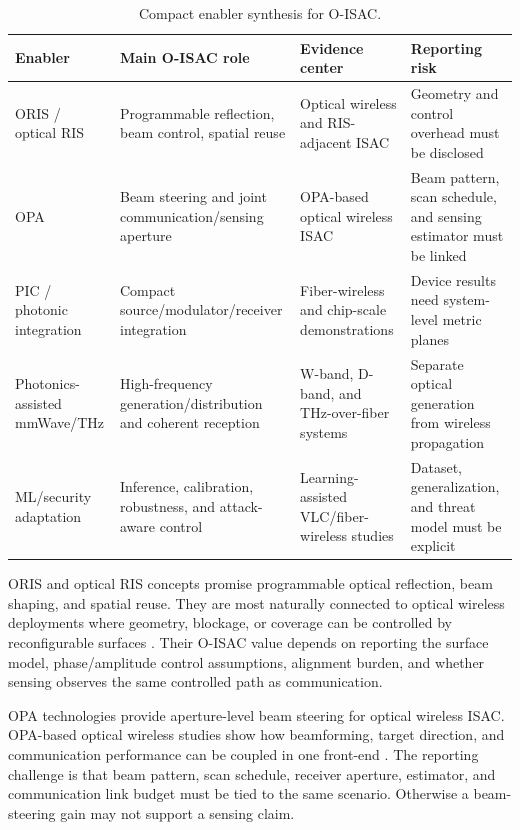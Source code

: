 \documentclass[letterpaper,journal]{IEEEtran}
\begin{document}
\begin{table}[!t]
    \caption{Compact enabler synthesis for O-ISAC.}
    \label{tab:vi_a_enablers}
    \centering
    \scriptsize
    \setlength{\tabcolsep}{2.8pt}
    \renewcommand{\arraystretch}{1.08}
    \begin{tabularx}{\textwidth}{@{}L{2.15cm}L{2.65cm}L{2.3cm}X@{}}
        \toprule
        Enabler & Main O-ISAC role & Evidence center & Reporting risk \\
        \midrule
        ORIS / optical RIS & Programmable reflection, beam control, spatial reuse & Optical wireless and RIS-adjacent ISAC \cite{O_ISAC_163} & Geometry and control overhead must be disclosed \\
        OPA & Beam steering and joint communication/sensing aperture & OPA-based optical wireless ISAC \cite{O_ISAC_061,O_ISAC_091} & Beam pattern, scan schedule, and sensing estimator must be linked \\
        PIC / photonic integration & Compact source/modulator/receiver integration & Fiber-wireless and chip-scale demonstrations \cite{O_ISAC_036,O_ISAC_045} & Device results need system-level metric planes \\
        Photonics-assisted mmWave/THz & High-frequency generation/distribution and coherent reception & W-band, D-band, and THz-over-fiber systems \cite{O_ISAC_029,O_ISAC_070} & Separate optical generation from wireless propagation \\
        ML/security adaptation & Inference, calibration, robustness, and attack-aware control & Learning-assisted VLC/fiber-wireless studies \cite{O_ISAC_039,O_ISAC_242} & Dataset, generalization, and threat model must be explicit \\
        \bottomrule
    \end{tabularx}
\end{table}

ORIS and optical RIS concepts promise programmable optical reflection, beam shaping, and spatial reuse. They are most naturally connected to optical wireless deployments where geometry, blockage, or coverage can be controlled by reconfigurable surfaces \cite{O_ISAC_112,O_ISAC_145,O_ISAC_156,O_ISAC_163,O_ISAC_200}. Their O-ISAC value depends on reporting the surface model, phase/amplitude control assumptions, alignment burden, and whether sensing observes the same controlled path as communication.

OPA technologies provide aperture-level beam steering for optical wireless ISAC. OPA-based optical wireless studies show how beamforming, target direction, and communication performance can be coupled in one front-end \cite{O_ISAC_008,O_ISAC_061,O_ISAC_091,O_ISAC_120}. The reporting challenge is that beam pattern, scan schedule, receiver aperture, estimator, and communication link budget must be tied to the same scenario. Otherwise a beam-steering gain may not support a sensing claim.
\end{document}
